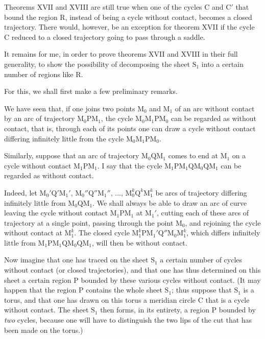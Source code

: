 \documentclass[11pt]{article}
\begin{document}
Theorems XVII and XVIII are still true when one of the cycles C and C$'$ that bound the region R, instead of being a cycle without contact, becomes a closed trajectory. There would, however, be an exception for theorem XVII if the cycle C reduced to a closed trajectory going to pass through a saddle.

It remains for me, in order to prove theorems XVII and XVIII in their full generality, to show the possibility of decomposing the sheet $\mathrm{S}_1$ into a certain number of regions like R.

For this, we shall first make a few preliminary remarks.

We have seen that, if one joins two points $\mathrm{M}_0$ and $\mathrm{M}_1$ of an arc without contact by an arc of trajectory $\mathrm{M}_0\mathrm{P}\mathrm{M}_1$, the cycle $\mathrm{M}_0\mathrm{M}_1\mathrm{P}\mathrm{M}_0$ can be regarded as without contact, that is, through each of its points one can draw a cycle without contact differing infinitely little from the cycle $\mathrm{M}_0\mathrm{M}_1\mathrm{P}\mathrm{M}_0$.

Similarly, suppose that an arc of trajectory $\mathrm{M}_0\mathrm{Q}\mathrm{M}_1$ comes to end at $\mathrm{M}_1$ on a cycle without contact $\mathrm{M}_1\mathrm{P}\mathrm{M}_1$. I say that the cycle $\mathrm{M}_1\mathrm{P}\mathrm{M}_1\mathrm{Q}\mathrm{M}_0\mathrm{Q}\mathrm{M}_1$ can be regarded as without contact.

Indeed, let $\mathrm{M}_0'\mathrm{Q}'\mathrm{M}_1'$, $\mathrm{M}_0''\mathrm{Q}''\mathrm{M}_1''$, $\ldots$, $\mathrm{M}_0^k\mathrm{Q}^k\mathrm{M}_1^k$ be arcs of trajectory differing infinitely little from $\mathrm{M}_0\mathrm{Q}\mathrm{M}_1$. We shall always be able to draw an arc of curve leaving the cycle without contact $\mathrm{M}_1\mathrm{P}\mathrm{M}_1$ at $\mathrm{M}_1'$, cutting each of these arcs of trajectory at a single point, passing through the point $\mathrm{M}_0$, and rejoining the cycle without contact at $\mathrm{M}_1^k$. The closed cycle $\mathrm{M}_1^k\mathrm{P}\mathrm{M}_1'\mathrm{Q}''\mathrm{M}_0\mathrm{M}_1^k$, which differs infinitely little from $\mathrm{M}_1\mathrm{P}\mathrm{M}_1\mathrm{Q}\mathrm{M}_0\mathrm{Q}\mathrm{M}_1$, will then be without contact.

Now imagine that one has traced on the sheet $\mathrm{S}_1$ a certain number of cycles without contact (or closed trajectories), and that one has thus determined on this sheet a certain region P bounded by these various cycles without contact. (It may happen that the region P contains the whole sheet $\mathrm{S}_1$; thus suppose that $\mathrm{S}_1$ is a torus, and that one has drawn on this torus a meridian circle C that is a cycle without contact. The sheet $\mathrm{S}_1$ then forms, in its entirety, a region P bounded by \emph{two} cycles, because one will have to distinguish the two lips of the cut that has been made on the torus.)
\end{document}
